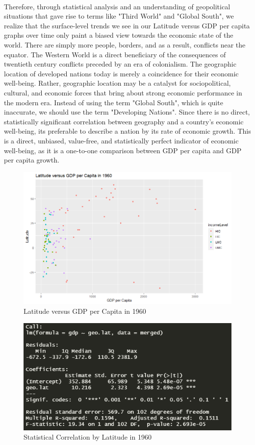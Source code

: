 \documentclass[15pt]{article}
\begin{document}
\\
Therefore, through statistical analysis and an understanding of geopolitical situations that gave rise to terms like "Third World" and "Global South", we realize that the surface-level trends we see in our Latitude versus GDP per capita graphs over time only paint a biased view towards the economic state of the world. There are simply more people, borders, and as a result, conflicts near the equator. The Western World is a direct beneficiary of the consequences of twentieth century conflicts preceded by an era of colonialism. The geographic location of developed nations today is merely a coincidence for their economic well-being. Rather, geographic location may be a catalyst for sociopolitical, cultural, and economic forces that bring about strong economic performance in the modern era. Instead of using the term "Global South", which is quite inaccurate, we should use the term "Developing Nations". Since there is no direct, statistically significant correlation between geography and a country's economic well-being, its preferable to describe a nation by its rate of economic growth. This is a direct, unbiased, value-free, and statistically perfect indicator of economic well-being, as it is a one-to-one comparison between GDP per capita and GDP per capita growth.

\begin{figure}[H]
    \centering
    \includegraphics[scale = 0.5]{Part1_1960.png}
    \caption{Latitude versus GDP per Capita in 1960}
\end{figure}

\begin{figure}[H]
    \centering
    \includegraphics[scale = 0.5]{Part1_latitude_r^2_1960.PNG}
    \caption{Statistical Correlation by Latitude in 1960}
\end{figure}
\end{document}
